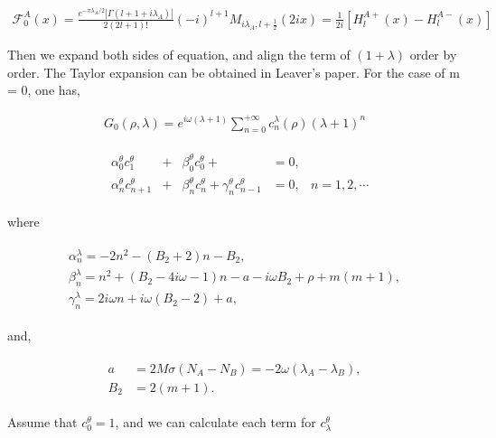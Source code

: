 \documentclass[11pt]{diazessay} %
\begin{document}
\begin{align}
    \mathcal{F}^{A}_{0}(x) =\frac{e^{-\pi \lambda_A / 2}\left|\Gamma\left(l+1+i \lambda_A\right)\right|}{2(2 l+1) !}(-i)^{l+1} M_{i \lambda_A, l+\frac{1}{2}}(2 i x)=\frac{1}{2 i}\left[H_l^{A+}(x)-H_l^{A-}(x)\right]
\end{align}

Then we expand both sides of equation, and align the term of $(1+\lambda)$ order by order. The Taylor expansion can be obtained in Leaver's paper. For the case of m = 0, one has,

\begin{align}
    G_0(\rho, \lambda)=e^{i \omega(\lambda+1)}\sum_{n=0}^{+\infty}c^{\lambda}_{n}(\rho)(\lambda+1)^{n}
\end{align}

\begin{align}
    \begin{aligned}
        &\alpha_0^\theta c_1^\theta&+&\beta_0^\theta c_0^\theta+&=0,&\\
        &\alpha_n^\theta c_{n+1}^\theta&+&\beta_n^\theta c_n^\theta+\gamma_n^\theta c_{n-1}^\theta&=0,&n=1,2, \cdots 
    \end{aligned}
\end{align}

where

\begin{align}
    \begin{array}{l}
    \alpha_n^\lambda=-2 n^2-\left(B_2+2\right) n-B_2, \\
    \beta_n^\lambda=n^2+\left(B_2-4 i \omega-1\right) n-a-i \omega B_2+\rho+m(m+1), \\
    \gamma_n^\lambda=2 i \omega n+i \omega\left(B_2-2\right)+a,
    \end{array}
\end{align}

and, 

\begin{align}
    \begin{aligned}
    a & =2 M \sigma\left(N_A-N_B\right)=-2 \omega\left(\lambda_A-\lambda_B\right), \\
    B_2 & =2(m+1) .
    \end{aligned}
\end{align}

Assume that $c^{\theta}_{0}=1$, and we can calculate each term for $c^{\theta}_{\lambda}$
\end{document}
